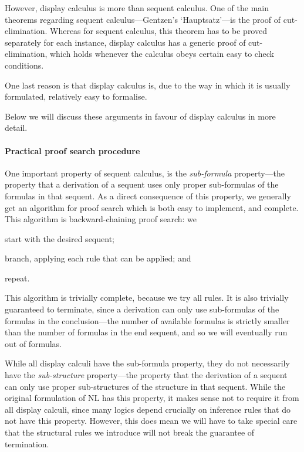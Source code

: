 However, display calculus is more than sequent calculus. One of the
main theorems regarding sequent calculus---Gentzen's `Hauptsatz'---is
the proof of cut-elimination. Whereas for sequent calculus, this
theorem has to be proved separately for each instance, display
calculus has a generic proof of cut-elimination, which holds whenever
the calculus obeys certain easy to check conditions.

One last reason is that display calculus is, due to the way in which
it is usually formulated, relatively easy to formalise.

Below we will discuss these arguments in favour of display calculus in
more detail.

\paragraph{Practical proof search procedure}
One important property of sequent calculus, is the \emph{sub-formula}
property---the property that a derivation of a sequent uses only
proper sub-formulas of the formulas in that sequent.
As a direct consequence of this property, we generally get an
algorithm for proof search which is both easy to implement, and
complete. This algorithm is backward-chaining proof search: we
\begin{enumerate*}[label=(\arabic*)]
\item start with the desired sequent;
\item branch, applying each rule that can be applied; and
\item repeat.
\end{enumerate*}
This algorithm is trivially complete, because we try all rules. It is
also trivially guaranteed to terminate, since a derivation can only
use sub-formulas of the formulas in the conclusion---the number of
available formulas is strictly smaller than the number of formulas in
the end sequent, and so we will eventually run out of formulas.

While all display calculi have the sub-formula property, they do not
necessarily have the \emph{sub-structure} property---the property that
the derivation of a sequent can only use proper sub-structures of the
structure in that sequent. While the original formulation of NL has
this property, it makes sense not to require it from all display
calculi, since many logics depend crucially on inference rules that do
not have this property.
However, this does mean we will have to take special care that the
structural rules we introduce will not break the guarantee of
termination.

